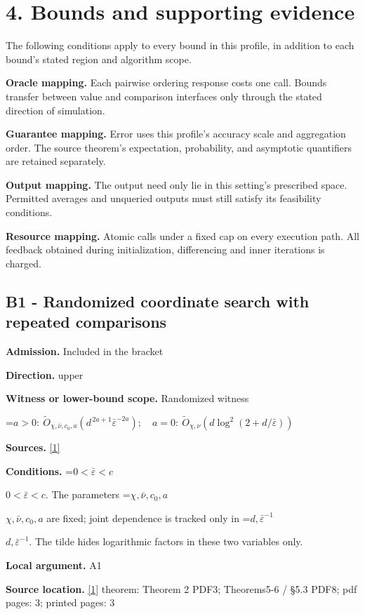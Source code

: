 \documentclass[10pt,a4paper]{article}
\newcommand{\AtlasMath}[1]{\par\begingroup\centering\setbox0=\hbox{$\displaystyle #1$}\ifdim\wd0>1.4\linewidth\typeout{ATLAS WIDE FORMULA: \the\wd0}\fi\ifdim\wd0>\linewidth\resizebox{\linewidth}{!}{\box0}\else\box0\fi\par\endgroup}
\newcommand{\AtlasInlineMath}[1]{\begingroup\setbox0=\hbox{$#1$}\ifdim\wd0>.4\linewidth\endgroup\AtlasMath{#1}\else\endgroup$#1$\fi}
\begin{document}
\section{4. Bounds and supporting evidence}
The following conditions apply to every bound in this profile, in addition to each bound's stated region and algorithm scope.

\textbf{Oracle mapping.} Each pairwise ordering response costs one call. Bounds transfer between value and comparison interfaces only through the stated direction of simulation.

\textbf{Guarantee mapping.} Error uses this profile's accuracy scale and aggregation order. The source theorem's expectation, probability, and asymptotic quantifiers are retained separately.

\textbf{Output mapping.} The output need only lie in this setting's prescribed space. Permitted averages and unqueried outputs must still satisfy its feasibility conditions.

\textbf{Resource mapping.} Atomic calls under a fixed cap on every execution path. All feedback obtained during initialization, differencing and inner iterations is charged.

\subsection{B1 - Randomized coordinate search with repeated comparisons}
\textbf{Admission.} Included in the bracket

\textbf{Direction.} upper

\textbf{Witness or lower-bound scope.} Randomized witness

\AtlasMath{a>0:\ \widetilde{O}_{\chi,\bar\nu,c_0,a}(d^{\,2a+1}\bar\varepsilon^{-2a});\quad a=0:\ \widetilde{O}_{\chi,\nu}(d\log^2(2+d/\bar\varepsilon))}
\textbf{Sources.} \href{https://papers.nips.cc/paper_files/paper/2012/file/e6d8545daa42d5ced125a4bf747b3688-Paper.pdf}{[1]}

\textbf{Conditions.} \AtlasInlineMath{0<\bar\varepsilon<c}. The parameters \AtlasInlineMath{\chi,\bar\nu,c_0,a} are fixed; joint dependence is tracked only in \AtlasInlineMath{d,\bar\varepsilon^{-1}}. The tilde hides logarithmic factors in these two variables only.

\textbf{Local argument.} A1

\textbf{Source location.} \href{https://papers.nips.cc/paper_files/paper/2012/file/e6d8545daa42d5ced125a4bf747b3688-Paper.pdf}{[1]} theorem: Theorem 2 PDF3; Theorems5-6 / §5.3 PDF8; pdf pages: 3; printed pages: 3
\end{document}
